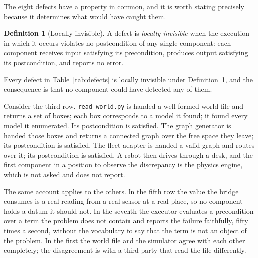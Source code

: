 \documentclass[11pt,a4paper]{article}
\theoremstyle{definition}
\newtheorem{definition}{Definition}
\newcommand{\code}[1]{\texttt{\small #1}}
\begin{document}
The eight defects have a property in common, and it is worth stating precisely
because it determines what would have caught them.

\begin{definition}[Locally invisible]
\label{def:invisible}
A defect is \emph{locally invisible} when the execution in which it occurs
violates no postcondition of any single component: each component receives
input satisfying its precondition, produces output satisfying its
postcondition, and reports no error.
\end{definition}

Every defect in Table~\ref{tab:defects} is locally invisible under
Definition~\ref{def:invisible}, and the consequence is that no component could
have detected any of them.

Consider the third row. \code{read\_world.py} is handed a well-formed world
file and returns a set of boxes; each box corresponds to a model it found; it
found every model it enumerated. Its postcondition is satisfied. The graph
generator is handed those boxes and returns a connected graph over the free
space they leave; its postcondition is satisfied. The fleet adapter is handed a
valid graph and routes over it; its postcondition is satisfied. A robot then
drives through a desk, and the first component in a position to observe the
discrepancy is the physics engine, which is not asked and does not report.

The same account applies to the others. In the fifth row the value the bridge
consumes is a real reading from a real sensor at a real place, so no component
holds a datum it should not. In the seventh the executor evaluates a
precondition over a term the problem does not contain and reports the failure
faithfully, fifty times a second, without the vocabulary to say that the term
is not an object of the problem. In the first the world file and the simulator
agree with each other completely; the disagreement is with a third party that
read the file differently.
\end{document}
